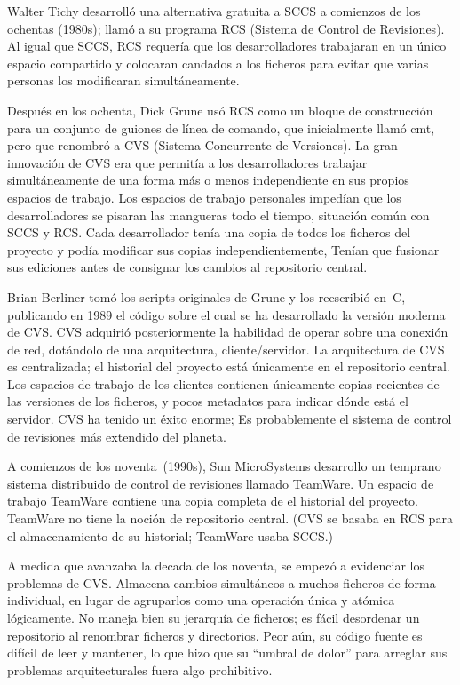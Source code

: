 Walter Tichy desarrolló una alternativa gratuita a SCCS a comienzos
de los ochentas (1980s); llamó a su programa RCS (Sistema de Control de
Revisiones).  Al igual que SCCS, RCS requería que los desarrolladores
trabajaran en un único espacio compartido y colocaran candados a los
ficheros para evitar que varias personas los modificaran
simultáneamente.

Después en los ochenta, Dick Grune usó RCS como un bloque de
construcción para un conjunto de guiones de línea de comando, que
inicialmente llamó cmt, pero que renombró a CVS (Sistema Concurrente de
Versiones).  La gran innovación de CVS era que permitía a los
desarrolladores trabajar simultáneamente de una forma más o menos
independiente en sus propios espacios de trabajo. Los espacios de
trabajo personales impedían que los desarrolladores se pisaran las
mangueras todo el tiempo, situación común con SCCS y RCS.  Cada
desarrollador tenía una copia de todos los ficheros del proyecto y podía
modificar sus copias independientemente, Tenían que fusionar sus
ediciones antes de consignar los cambios al repositorio central.

Brian Berliner tomó los scripts originales de Grune y los reescribió
en~C, publicando en 1989 el código sobre el cual se ha
desarrollado la versión moderna de CVS.  CVS adquirió posteriormente 
la habilidad de operar sobre una conexión de red, dotándolo de una
arquitectura, cliente/servidor. La arquitectura de CVS es
centralizada; el historial del proyecto está únicamente en el
repositorio central.  Los espacios de trabajo de los clientes
contienen únicamente copias recientes de las versiones de los
ficheros, y pocos metadatos para indicar dónde está el servidor. CVS
ha tenido un éxito enorme; Es probablemente el sistema de control de
revisiones más extendido del planeta.

A comienzos de los noventa~(1990s), Sun MicroSystems desarrollo un
temprano sistema distribuido de control de revisiones llamado
TeamWare.
Un espacio de trabajo TeamWare contiene una copia completa de el
historial del proyecto. TeamWare no tiene la noción de repositorio
central. (CVS se basaba en RCS para el almacenamiento de su historial;
TeamWare usaba SCCS.)

A medida que avanzaba la decada de los noventa, se empezó a
evidenciar los problemas de CVS.  Almacena cambios simultáneos a muchos
ficheros de forma individual, en lugar de agruparlos como una
operación única y atómica lógicamente.  No maneja bien su jerarquía de
ficheros; es fácil desordenar un repositorio al renombrar ficheros
y directorios. Peor aún, su código fuente es difícil de leer y
mantener, lo que hizo que su ``umbral de dolor'' para arreglar sus
problemas arquitecturales fuera algo prohibitivo.

